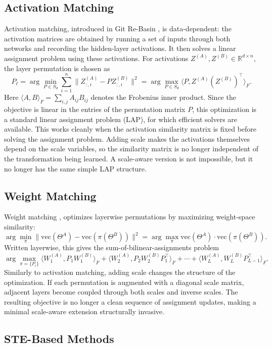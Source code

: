 \documentclass[11pt,a4paper]{report}
\begin{document}
\subsection{Activation Matching}
Activation matching, introduced in Git Re-Basin \citep{ainsworth2023git}, is data-dependent: the activation matrices are obtained by running a set of inputs through both networks and recording the hidden-layer activations. It then solves a linear assignment problem using these activations. For activations \(Z^{(A)}, Z^{(B)} \in \mathbb{R}^{d \times n}\), the layer permutation is chosen as
\[
P_\ell
=
\arg\min_{P \in S_d}
\sum_{i=1}^n \|Z^{(A)}_{:,i} - P Z^{(B)}_{:,i}\|^2
=
\arg\max_{P \in S_d}
\langle P, Z^{(A)}(Z^{(B)})^\top \rangle_F.
\]
Here \(\langle A,B\rangle_F=\sum_{i,j}A_{ij}B_{ij}\) denotes the Frobenius inner product. Since the objective is linear in the entries of the permutation matrix \(P\), this optimization is a standard linear assignment problem (LAP), for which efficient solvers are available.
This works cleanly when the activation similarity matrix is fixed before solving the assignment problem. Adding scale makes the activations themselves depend on the scale variables, so the similarity matrix is no longer independent of the transformation being learned. A scale-aware version is not impossible, but it no longer has the same simple LAP structure.


\subsection{Weight Matching}

Weight matching \citep{ainsworth2023git}, optimizes layerwise permutations by maximizing weight-space similarity:
\[
\arg\min_{\pi} \|\mathrm{vec}(\Theta^A)-\mathrm{vec}(\pi(\Theta^B))\|^2
=
\arg\max_{\pi}\mathrm{vec}(\Theta^A)\cdot\mathrm{vec}(\pi(\Theta^B)).
\]
Written layerwise, this gives the sum-of-bilinear-assignments problem
\[
\arg\max_{\pi=\{P_i\}}
\langle W_1^{(A)},P_1W_1^{(B)}\rangle_F
+\langle W_2^{(A)},P_2W_2^{(B)}P_1^\top\rangle_F
+\cdots+
\langle W_L^{(A)},W_L^{(B)}P_{L-1}^\top\rangle_F.
\]
Similarly to activation matching, adding scale changes the structure of the optimization. If each permutation is augmented with a diagonal scale matrix, adjacent layers become coupled through both scales and inverse scales. The resulting objective is no longer a clean sequence of assignment updates, making a minimal scale-aware extension structurally invasive.


\subsection{STE-Based Methods}
\end{document}
